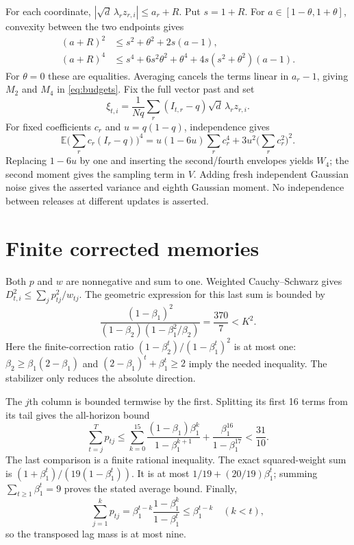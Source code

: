 \documentclass[11pt]{article}
\newcommand{\E}{\mathbb E}
\begin{document}
For each coordinate, $|\sqrt d\,\lambda_r z_{r,i}|\le a_r+R$.
Put $s=1+R$. For $a\in[1-\theta,1+\theta]$, convexity between the
two endpoints gives
\begin{align*}
 (a+R)^2&\le s^2+\theta^2+2s(a-1),\\
 (a+R)^4&\le s^4+6s^2\theta^2+\theta^4
                  +4s(s^2+\theta^2)(a-1).
\end{align*}
For $\theta=0$ these are equalities. Averaging cancels the terms linear in
$a_r-1$, giving $M_2$ and $M_4$ in \eqref{eq:budgets}.
Fix the full vector past and set
\[
 \xi_{t,i}=\frac1{Nq}\sum_r(I_{t,r}-q)\sqrt d\,\lambda_rz_{r,i}.
\]
For fixed coefficients $c_r$ and $u=q(1-q)$, independence gives
\[
 \E\Big(\sum_r c_r(I_r-q)\Big)^4
 =u(1-6u)\sum_rc_r^4+3u^2\Big(\sum_rc_r^2\Big)^2.
\]
Replacing $1-6u$ by one and inserting the second/fourth envelopes yields
$W_4$; the second moment gives the sampling term in $V$.
Adding fresh independent Gaussian noise gives the asserted variance and
eighth Gaussian moment. No independence between releases at different
updates is asserted.

\section{Finite corrected memories}
Both $p$ and $w$ are nonnegative and sum to one. Weighted Cauchy--Schwarz
gives $D_{t,i}^2\le\sum_jp_{tj}^2/w_{tj}$.
The geometric expression for this last sum is bounded by
\[
 \frac{(1-\beta_1)^2}{(1-\beta_2)(1-\beta_1^2/\beta_2)}
 =\frac{370}{7}<K^2.
\]
Here the finite-correction ratio
$(1-\beta_2^t)/(1-\beta_1^t)^2$ is at most one:
$\beta_2\ge\beta_1(2-\beta_1)$ and
$(2-\beta_1)^t+\beta_1^t\ge2$ imply the needed inequality.
The stabilizer only reduces the absolute direction.

The $j$th column is bounded termwise by the first. Splitting its first
16 terms from its tail gives the all-horizon bound
\[
 \sum_{t=j}^T p_{tj}
 \le\sum_{k=0}^{15}\frac{(1-\beta_1)\beta_1^k}{1-\beta_1^{k+1}}
       +\frac{\beta_1^{16}}{1-\beta_1^{17}}<\frac{31}{10}.
\]
The last comparison is a finite rational inequality. The exact squared-weight
sum is $(1+\beta_1^t)/(19(1-\beta_1^t))$.
It is at most $1/19+(20/19)\beta_1^t$; summing
$\sum_{t\ge1}\beta_1^t=9$ proves the stated average bound.
Finally,
\[
 \sum_{j=1}^k p_{tj}
 =\beta_1^{t-k}\frac{1-\beta_1^k}{1-\beta_1^t}
 \le\beta_1^{t-k}\quad(k<t),
\]
so the transposed lag mass is at most nine.
\end{document}
